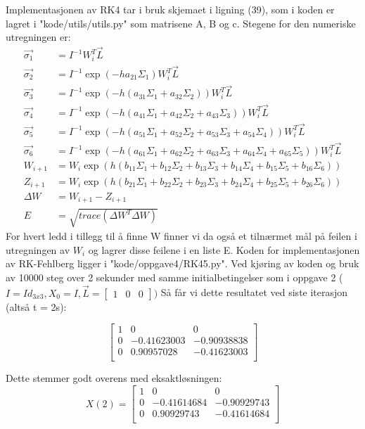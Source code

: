 Implementasjonen av RK4 tar i bruk skjemaet i ligning (39), som i koden er lagret i "kode/utils/utils.py" som matrisene A, B og c.\newline 
Stegene for den numeriske utregningen er: \newline
$$
\begin{aligned}
\vec{\sigma_1} &= I^{-1}W_i^T\vec{L} \\
\vec{\sigma_2} &= I^{-1}\exp(-ha_{21}\Sigma_1)W_i^T\vec{L} \\
\vec{\sigma_3} &= I^{-1}\exp(-h(a_{31}\Sigma_1 + a_{32}\Sigma_2))W_i^T\vec{L}  \\
\vec{\sigma_4} &= I^{-1}\exp(-h(a_{41}\Sigma_1 + a_{42}\Sigma_2 + a_{43}\Sigma_3))W_i^T\vec{L}  \\
\vec{\sigma_5} &= I^{-1}\exp(-h(a_{51}\Sigma_1 + a_{52}\Sigma_2 + a_{53}\Sigma_3 + a_{54}\Sigma_4))W_i^T\vec{L} \\
\vec{\sigma_6} &= I^{-1}\exp(-h(a_{61}\Sigma_1 + a_{62}\Sigma_2 + a_{63}\Sigma_3 + a_{64}\Sigma_4 + a_{65}\Sigma_5))W_i^T\vec{L}  \\
W_{i+1} &= W_i\exp(h(b_{11}\Sigma_1 + b_{12}\Sigma_2 + b_{13}\Sigma_3 + b_{14}\Sigma_4 + b_{15}\Sigma_5 + b_{16}\Sigma_6)) \\
Z_{i+1} &= W_i\exp(h(b_{21}\Sigma_1 + b_{22}\Sigma_2 + b_{23}\Sigma_3 + b_{24}\Sigma_4 + b_{25}\Sigma_5 + b_{26}\Sigma_6)) \\
\Delta W &= W_{i+1} - Z_{i+1} \\
E &= \sqrt{trace(\Delta W^T \Delta W)}
\end{aligned}
$$
For hvert ledd i tillegg til å finne W finner vi da også et tilnærmet mål på feilen i utregningen av $W_{i}$ og lagrer disse feilene i en liste E.\newline \newline
Koden for implementasjonen av RK-Fehlberg ligger i "kode/oppgave4/RK45.py".\newline
Ved kjøring av koden og bruk av 10000 steg over 2 sekunder med samme initialbetingelser som i oppgave 2 ($I=Id_{3x3}, X_0 = I, \vec{L} = \begin{bmatrix} 1 & 0 & 0\end{bmatrix})$ Så får vi dette resultatet ved siste iterasjon (altså t = 2s):\newline\newline

$$
\begin{bmatrix}
1&0&0\\
0&-0.41623003&-0.90938838\\
0&0.90957028&-0.41623003\\
\end{bmatrix}
$$

Dette stemmer godt overens med eksaktløsningen: \newline
$$
X(2) =     
\begin{bmatrix}
1 & 0 & 0\\
0 & -0.41614684 & -0.90929743\\
0 & 0.90929743 & -0.41614684\\
\end{bmatrix}
$$